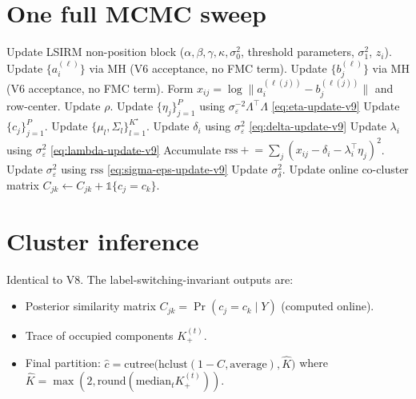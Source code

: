 \documentclass[11pt]{article}
\begin{document}
\section{One full MCMC sweep}

\begin{algorithm}[H]
\caption{One sweep of joint LSIRM~+~PPCA-mixture (V9, one-way coupling)}
\begin{algorithmic}[1]
\State Update LSIRM non-position block ($\alpha,\beta,\gamma,\kappa,\sigma_0^2$, threshold parameters, $\sigma_1^2$, $z_i$).
\State Update $\{a_i^{(\ell)}\}$ via MH (V6 acceptance, no FMC term).
\State Update $\{b_j^{(\ell)}\}$ via MH (V6 acceptance, no FMC term).
\State Form $x_{ij}=\log\|a_i^{(\ell(j))}-b_j^{(\ell(j))}\|$ and row-center.
    \State Update $\rho$.
    \State Update $\{\eta_j\}_{j=1}^P$ using $\sigma_\varepsilon^{-2}\Lambda^\top\Lambda$ \hfill\eqref{eq:eta-update-v9}
    \State Update $\{c_j\}_{j=1}^P$.
    \State Update $\{\mu_l,\Sigma_l\}_{l=1}^{K^\star}$.
        \State Update $\delta_i$ using $\sigma_\varepsilon^2$ \hfill\eqref{eq:delta-update-v9}
        \State Update $\lambda_i$ using $\sigma_\varepsilon^2$ \hfill\eqref{eq:lambda-update-v9}
        \State Accumulate $\mathrm{rss}\mathrel{+}=\sum_j(x_{ij}-\delta_i-\lambda_i^\top\eta_j)^2$.
    \EndFor
    \State Update $\sigma_\varepsilon^2$ using $\mathrm{rss}$ \hfill\eqref{eq:sigma-eps-update-v9}
    \State Update $\sigma_\delta^2$.
    \State Update online co-cluster matrix $C_{jk}\leftarrow C_{jk}+\mathbb{1}\{c_j=c_k\}$.
\EndIf
\end{algorithmic}
\end{algorithm}

\section{Cluster inference}

Identical to V8.
The label-switching-invariant outputs are:
\begin{itemize}[leftmargin=1.5em]
    \item Posterior similarity matrix $C_{jk}=\Pr(c_j=c_k\mid Y)$ (computed online).
    \item Trace of occupied components $K_+^{(t)}$.
    \item Final partition: $\hat c=\mathrm{cutree}\bigl(\mathrm{hclust}(1-C,\text{average}),\hat K\bigr)$ where $\hat K=\max(2,\mathrm{round}(\mathrm{median}_t K_+^{(t)}))$.
\end{itemize}
\end{document}
